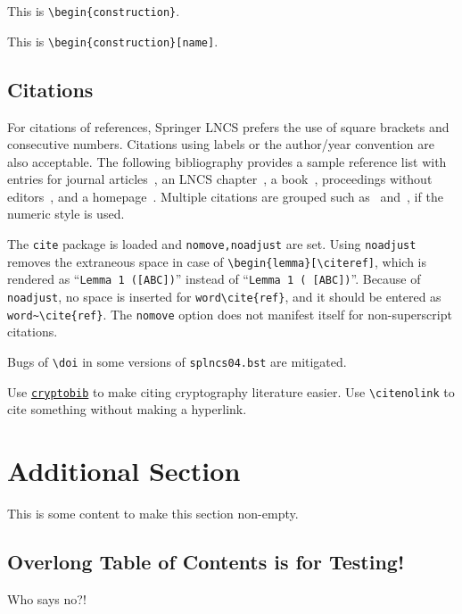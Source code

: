 \begin{construction}
This is \texttt{\textbackslash begin\{construction\}}.
\end{construction}

\begin{construction}
[name]
This is \texttt{\textbackslash begin\{construction\}[name]}.
\end{construction}

\subsection
[Citations~\citenolink{ref_article1}]
{Citations~\cite{ref_article1}}

For citations of references, Springer LNCS prefers the use of square brackets
and consecutive numbers. Citations using labels or the author/year
convention are also acceptable. The following bibliography provides
a sample reference list with entries for journal
articles~\cite{ref_article1}, an LNCS chapter~\cite{ref_lncs1}, a
book~\cite{ref_book1}, proceedings without editors~\cite{ref_proc1},
and a homepage~\cite{ref_url1}. Multiple citations are grouped
such as~\cite{ref_article1,ref_lncs1,ref_book1}
and~\cite{ref_article1,ref_book1,ref_proc1,ref_url1},
if the numeric style is used.

The \texttt{cite} package is loaded and \texttt{nomove,noadjust} are set.
Using \texttt{noadjust} removes the extraneous space
in case of \texttt{\textbackslash begin\{lemma\}[\textbackslash cite{ref}]},
which is rendered as ``\texttt{Lemma 1 ([ABC])}''
instead of ``\texttt{Lemma 1 ( [ABC])}''.
Because of \texttt{noadjust},
no space is inserted for \texttt{word\textbackslash cite\{ref\}},
and it should be entered as
\texttt{word\textasciitilde\textbackslash cite\{ref\}}.
The \texttt{nomove} option does not manifest itself
for non-superscript citations.

Bugs of \texttt{\textbackslash doi}
in some versions of \texttt{splncs04.bst}
are mitigated.

Use
\href{https://github.com/cryptobib/export}{\texttt{cryptobib}}
to make citing cryptography literature easier.
Use \texttt{\textbackslash citenolink} to
cite something without making a hyperlink.

\long\def\myrepeat#1\relax{#1\relax#1\relax}

\myrepeat\myrepeat\myrepeat\myrepeat\myrepeat
{}
\section{Additional Section }
This is some content to make this section non-empty.
\relax

\let\myrepeat\relax
\let\mysection\relax

\subsection{Overlong Table of Contents is for Testing!}

Who says no?!
